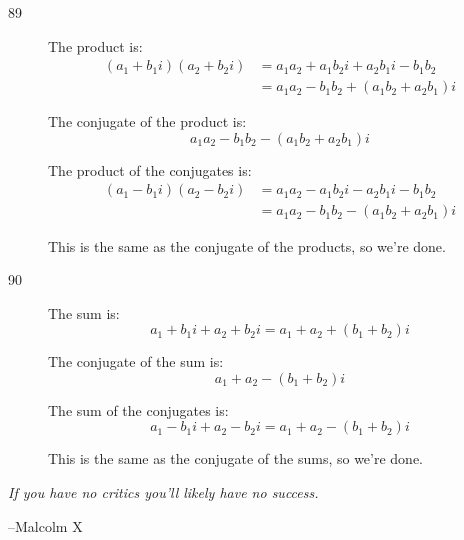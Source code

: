 \documentclass[fleqn,addpoints]{exam}
\begin{document}
\ifprintanswers
\begin{description}


\item[89]
The product is:
\begin{align*}
  (a_1+b_1i)(a_2 + b_2i) &= a_1a_2 + a_1b_2i + a_2b_1i - b_1b_2 \\
  &= a_1a_2 - b_1b_2 + (a_1b_2 + a_2b_1)i 
\end{align*}

The conjugate of the product is:
\[
  a_1a_2 - b_1b_2 - (a_1b_2 + a_2b_1)i 
\]

The product of the conjugates is:
\begin{align*}
  (a_1 - b_1i)(a_2 - b_2i) &= a_1a_2 - a_1b_2i - a_2b_1i - b_1b_2 \\
  &= a_1a_2 - b_1b_2 - (a_1b_2 + a_2b_1)i 
\end{align*}

This is the same as the conjugate of the products, so we're done.

\item[90]
The sum is:
\[
  a_1+b_1i + a_2 + b_2i = a_1+a_2 + (b_1 + b_2)i 
\]

The conjugate of the sum is:
\[
  a_1+a_2 - (b_1 + b_2)i 
\]

The sum of the conjugates is:
\[
  a_1 - b_1i + a_2 - b_2i = a_1 + a_2 - (b_1 + b_2)i
\]

This is the same as the conjugate of the sums, so we're done.

\end{description}

\fi

\ifprintanswers
\else
\vspace{10 cm}

{\em If you have no critics you'll likely have no success.}

\vspace{.1 cm}
\hspace{1 cm} --Malcolm X

\fi
\end{document}
